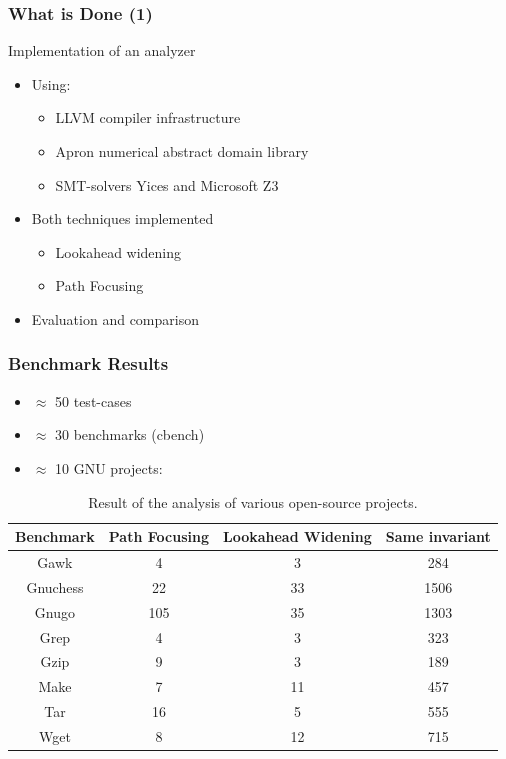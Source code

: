 \documentclass{beamer}
\begin{document}
\begin{frame}
  \frametitle{What is Done (1)}

Implementation of an analyzer
\begin{itemize}
\item 
Using:
\begin{itemize}
\item LLVM compiler infrastructure
\item Apron numerical abstract domain library
\item SMT-solvers Yices and Microsoft Z3
\end{itemize}

\item  Both techniques implemented
\begin{itemize}
\item Lookahead widening
\item Path Focusing
\end{itemize}

\item Evaluation and comparison
\end{itemize}
\end{frame}



\begin{frame}
\frametitle{Benchmark Results}

\begin{itemize}
\item $\approx$ 50 test-cases
\item $\approx$ 30 benchmarks (cbench)
\item $\approx$ 10 GNU projects:
\end{itemize}

\begin{table}
\centering \small
\begin{tabular}{|c||c|c|c|} \hline 
Benchmark & Path Focusing & Lookahead Widening & Same invariant \\
\hline \hline
Gawk		& 4 & 3 & 284  \\ \hline
Gnuchess	& 22 & 33 & 1506  \\ \hline
Gnugo		& 105 & 35 & 1303  \\ \hline
Grep		& 4 & 3 & 323  \\ \hline
Gzip		& 9 & 3 & 189  \\ \hline
Make		&  7 & 11 & 457  \\ \hline
Tar			& 16 & 5 & 555  \\ \hline
Wget		& 8 & 12 & 715  \\ \hline
\end{tabular}
\caption{Result of the analysis of various open-source projects.}
\label{opensource}
\end{table}
\end{frame}
\end{document}
